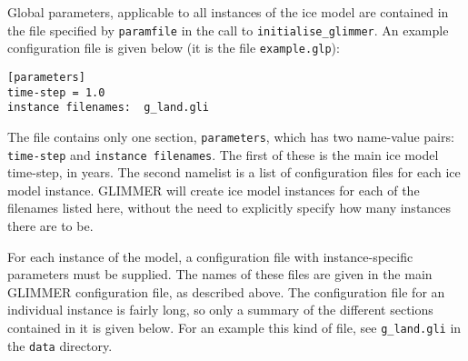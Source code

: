 Global parameters, applicable to all instances of the ice model are contained
in the file specified by \texttt{paramfile} in the call to
\texttt{initialise\_glimmer}. An example configuration file is given below (it is
the file \texttt{example.glp}):
%
\begin{verbatim}
[parameters]
time-step = 1.0
instance filenames:  g_land.gli
\end{verbatim}
%
The file contains only one section, \texttt{parameters}, which has two
name-value pairs: \texttt{time-step} and \texttt{instance filenames}. The
first of these is the main ice model time-step, in years. The second namelist
is a list of configuration files for each ice model instance. GLIMMER will
create ice model instances for each of the filenames listed here, without the
need to explicitly specify how many instances there are to be.

For each instance of the model, a configuration file with instance-specific
parameters must be supplied. The names of these files are given in the main
GLIMMER configuration file, as described above. The configuration file for an individual
instance is fairly long, so only a summary of the different sections
contained in it is given below. For an example this kind of file, see
\texttt{g\_land.gli} in the \texttt{data} directory.

